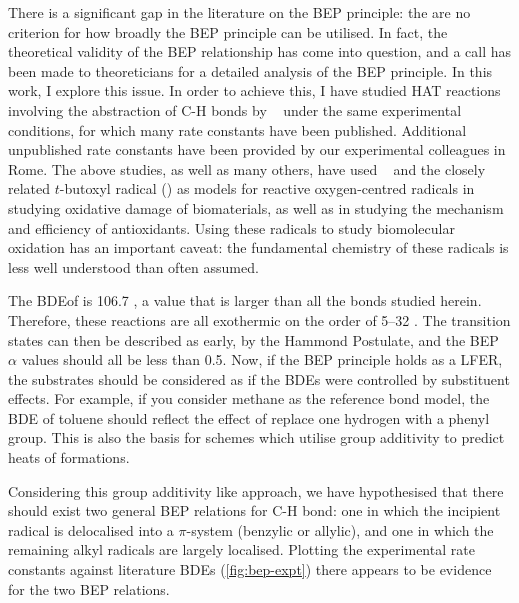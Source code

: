 There is a significant gap in the literature on the BEP principle: the are no criterion for how broadly the BEP principle can be utilised. In fact, the theoretical validity of the BEP relationship has come into question, and a call has been made to theoreticians for a detailed analysis of the BEP principle.\cite{vanSanten2010} In this work, I explore this issue. In order to achieve this, I have studied HAT reactions involving the abstraction of C-H bonds by \cumo~ under the same experimental conditions, for which many rate constants have been published.\cite{Bietti2010, Bietti2011, Pischel2001, Salamone2011, Salamone2012, Salamone2012a, Salamone2013, Salamone2015} Additional unpublished rate constants have been provided by our experimental colleagues in Rome. The above studies, as well as many others, have used \cumo~ and the closely related $t$-butoxyl radical () as models for reactive oxygen-centred radicals in studying oxidative damage of biomaterials,\cite{Adam1998, Adam2002, Jones2003} as well as in studying the mechanism and efficiency of antioxidants.\cite{MacFaul1996, Valgimigli1996, Valgimigli1999, Jovanovic1999, Sortino2003} Using these radicals to study biomolecular oxidation has an important caveat: the fundamental chemistry of these radicals is less well understood than often assumed. \cite{Tanko2001, Finn2004, Salamone2011b}

The BDE\footnotemark of  is 106.7 \kcalmol, a value that is larger than all the  bonds studied herein. Therefore, these reactions are all exothermic on the order of 5--32 \kcalmol. The transition states can then be described as early, by the Hammond Postulate, and the BEP $\alpha$ values should all be less than 0.5.\cite{Russell1973} Now, if the BEP principle holds as a LFER, the substrates should be considered as if the BDEs were controlled by substituent effects. For example, if you consider methane as the reference  bond model, the BDE of toluene should reflect the effect of replace one hydrogen with a phenyl group. This is also the basis for schemes which utilise group additivity to predict heats of formations.\cite{Benson1976}


Considering this group additivity like approach, we have hypothesised that there should exist two general BEP relations for C-H bond: one in which the incipient radical is delocalised into a $\pi$-system (benzylic or allylic), and one in which the remaining alkyl radicals are largely localised. Plotting the experimental rate constants against literature BDEs (\ref{fig:bep-expt}) there appears to be evidence for the two BEP relations.

